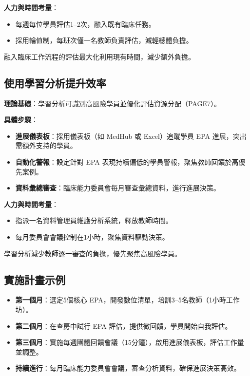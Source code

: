 \documentclass[12pt,a4paper]{article}
\newcommand{\note}[1]{
    \par
    \noindent
    \begin{tcolorbox}[
        colback=emergency_blue!5!white,
        colframe=emergency_blue,
        title=\textbf{重點提醒},
        fonttitle=\bfseries,
        boxrule=0.5pt,
        arc=3pt,
        left=6pt,
        right=6pt,
        top=6pt,
        bottom=6pt
    ]
    #1
    \end{tcolorbox}
}
\begin{document}
\textbf{人力與時間考量}：
\begin{itemize}[nosep]
    \item 每週每位學員評估1–2次，融入既有臨床任務。
    \item 採用輪值制，每班次僅一名教師負責評估，減輕總體負擔。
\end{itemize}

\vspace{0.5cm}
\note{
融入臨床工作流程的評估最大化利用現有時間，減少額外負擔。
}

\subsection{使用學習分析提升效率}
\textbf{理論基礎}：學習分析可識別高風險學員並優化評估資源分配（PAGE7）。

\textbf{具體步驟}：
\begin{itemize}[nosep]
    \item \textbf{進展儀表板}：採用儀表板（如 MedHub 或 Excel）追蹤學員 EPA 進展，突出需額外支持的學員。
    \item \textbf{自動化警報}：設定針對 EPA 表現持續偏低的學員警報，聚焦教師回饋於高優先案例。
    \item \textbf{資料彙總審查}：臨床能力委員會每月審查彙總資料，進行進展決策。
\end{itemize}

\textbf{人力與時間考量}：
\begin{itemize}[nosep]
    \item 指派一名資料管理員維護分析系統，釋放教師時間。
    \item 每月委員會會議控制在1小時，聚焦資料驅動決策。
\end{itemize}

\vspace{0.5cm}
\note{
學習分析減少教師逐一審查的負擔，優先聚焦高風險學員。
}

\subsection{實施計畫示例}
\begin{itemize}[nosep]
    \item \textbf{第一個月}：選定5個核心 EPA，開發數位清單，培訓3–5名教師（1小時工作坊）。
    \item \textbf{第二個月}：在查房中試行 EPA 評估，提供微回饋，學員開始自我評估。
    \item \textbf{第三個月}：實施每週團體回饋會議（15分鐘），啟用進展儀表板，評估工作量並調整。
    \item \textbf{持續進行}：每月臨床能力委員會會議，審查分析資料，確保進展決策高效。
\end{itemize}
\end{document}
